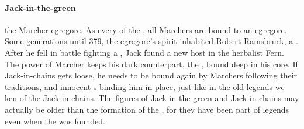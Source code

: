 \paragraph{Jack-in-the-green} the Marcher egregore. As every  of the , all Marchers are bound to an egregore. Some generations until 379, the egregore's spirit inhabited Robert Ramsbruck, a . After he fell in battle fighting a , Jack found a new host in the herbalist Fern. The power of Marcher  keeps his dark counterpart, the , bound deep in his core. If Jack-in-chains gets loose, he needs to be bound again by Marchers following their traditions, and innocent s binding him in place, just like in the old legends we ken of the Jack-in-chains. The figures of Jack-in-the-green and Jack-in-chains may actually be older than the formation of the , for they have been part of legends even when the  was founded.
